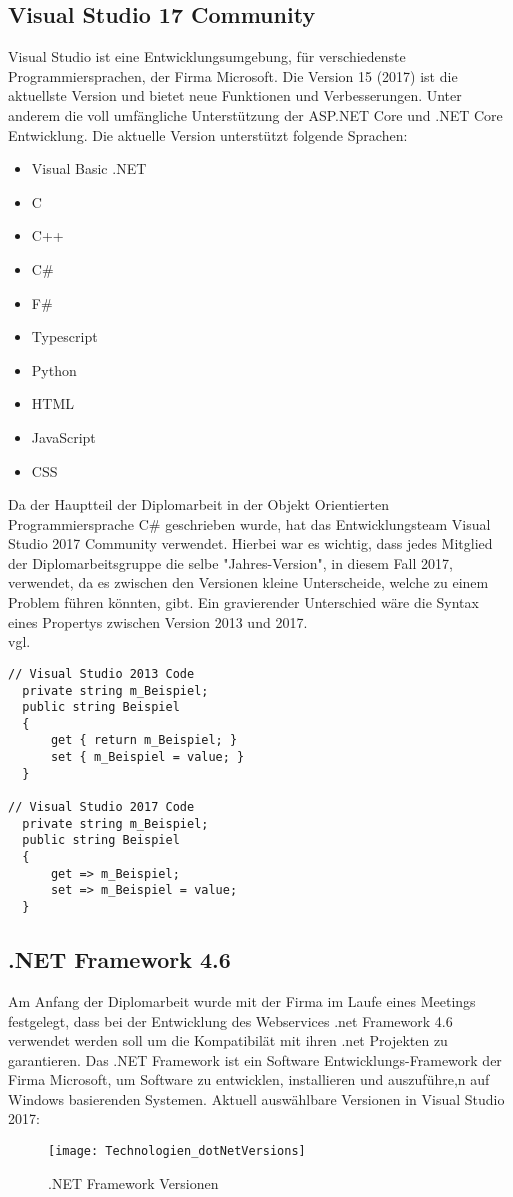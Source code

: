 \subsection{Visual Studio 17 Community}
\label{sec:VisualStudio17Community}
Visual Studio ist eine Entwicklungsumgebung, für verschiedenste Programmiersprachen, der Firma Microsoft. Die Version 15 (2017) ist die aktuellste Version und bietet neue Funktionen und Verbesserungen. Unter anderem die voll umfängliche Unterstützung der ASP.NET Core und .NET Core Entwicklung. Die aktuelle Version unterstützt folgende Sprachen:
\begin{itemize}
\item Visual Basic .NET
\item C
\item C++
\item C\#
\item F\#
\item Typescript
\item Python
\item HTML
\item JavaScript
\item CSS
\end{itemize}
Da der Hauptteil der Diplomarbeit in der Objekt Orientierten Programmiersprache C\# geschrieben wurde, hat das Entwicklungsteam Visual Studio 2017 Community verwendet. Hierbei war es wichtig, dass jedes Mitglied der Diplomarbeitsgruppe die selbe "Jahres-Version", in diesem Fall 2017, verwendet, da es zwischen den Versionen kleine Unterscheide, welche zu einem Problem führen könnten, gibt. Ein gravierender Unterschied wäre die Syntax eines Propertys zwischen Version 2013 und 2017. \\vgl. \cite{visualstudio}
\begin{lstlisting}[caption=Syntax Unterschied: Property , label=lst:test]
// Visual Studio 2013 Code
  private string m_Beispiel;
  public string Beispiel
  {
      get { return m_Beispiel; }
      set { m_Beispiel = value; }
  }

// Visual Studio 2017 Code
  private string m_Beispiel;
  public string Beispiel
  {
      get => m_Beispiel;
      set => m_Beispiel = value;
  }
\end{lstlisting}

\subsection{.NET Framework 4.6}
\label{sec:.NETFramework4.6}
Am Anfang der Diplomarbeit wurde mit der Firma im Laufe eines Meetings festgelegt, dass bei der Entwicklung des Webservices .net Framework 4.6 verwendet werden soll um die Kompatibilät mit ihren .net Projekten zu garantieren.
Das .NET Framework ist ein Software Entwicklungs-Framework der Firma Microsoft, um Software zu entwicklen, installieren und auszuführe,n auf Windows basierenden Systemen. 
Aktuell auswählbare Versionen in Visual Studio 2017:\\ 
\begin{figure}[H]
	\centering
    \texttt{[image: Technologien\_dotNetVersions]}
    \caption{.NET Framework Versionen}
    \label{fig:netFramework}
\end{figure}
\justifying
